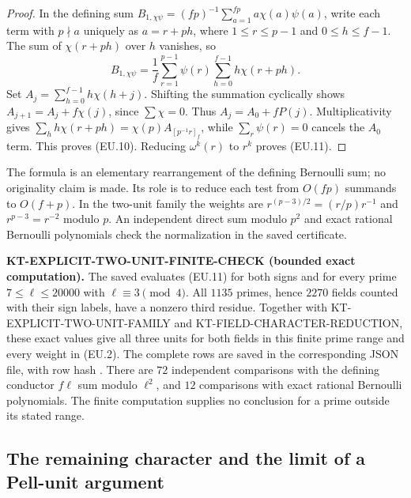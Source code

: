 \documentclass[11pt,a4paper]{article}
\theoremstyle{definition}
\renewcommand{\paragraph}[1]{\par\smallskip\noindent\textbf{#1}\quad\ignorespaces}
\begin{document}
\begin{proof}
In the defining sum
$B_{1,\chi\psi}=(fp)^{-1}\sum_{a=1}^{fp}a\chi(a)\psi(a)$,
write each term with $p\nmid a$ uniquely as $a=r+ph$, where
$1\leq r\leq p-1$ and $0\leq h\leq f-1$.  The sum of
$\chi(r+ph)$ over $h$ vanishes, so
\[
 B_{1,\chi\psi}=\frac1f\sum_{r=1}^{p-1}\psi(r)
                       \sum_{h=0}^{f-1}h\chi(r+ph).
\]
Set $A_j=\sum_{h=0}^{f-1}h\chi(h+j)$.  Shifting the summation
cyclically shows $A_{j+1}=A_j+f\chi(j)$, since $\sum\chi=0$.
Thus $A_j=A_0+fP(j)$.  Multiplicativity gives
$\sum_hh\chi(r+ph)=\chi(p)A_{[p^{-1}r]_f}$, while
$\sum_r\psi(r)=0$ cancels the $A_0$ term.  This proves (EU.10).
Reducing $\omega^k(r)$ to $r^k$ proves (EU.11).
\end{proof}

The formula is an elementary rearrangement of the defining Bernoulli
sum; no originality claim is made.  Its role is to reduce each test
from $O(fp)$ summands to $O(f+p)$.  In the two-unit family the weights
are $r^{(p-3)/2}=(r/p)r^{-1}$ and $r^{p-3}=r^{-2}$ modulo $p$.
An independent direct sum modulo $p^2$ and exact rational Bernoulli
polynomials check the normalization in the saved certificate.

\paragraph{KT-EXPLICIT-TWO-UNIT-FINITE-CHECK (bounded exact computation).}
The saved  evaluates
(EU.11) for both signs and for every prime
$7\leq\ell\leq20000$ with $\ell\equiv3\pmod4$.
All $1135$ primes, hence $2270$ fields counted with their sign labels,
have a nonzero third residue.  Together with
KT-EXPLICIT-TWO-UNIT-FAMILY and KT-FIELD-CHARACTER-REDUCTION, these
exact values give all three units for both fields in this finite
prime range and every weight in (EU.2).
The complete rows are saved in the corresponding JSON file, with
row hash
.
There are $72$ independent comparisons with the defining conductor
$f\ell$ sum modulo $\ell^2$, and $12$ comparisons with exact rational
Bernoulli polynomials.  The finite computation supplies no conclusion
for a prime outside its stated range.



\subsection{The remaining character and the limit of a Pell-unit argument}
\label{sec:kt-third-unit-character}
\end{document}
